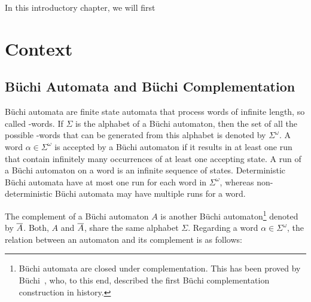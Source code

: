 In this introductory chapter, we will first 






\section{Context}
\label{1_context}

\subsection{Büchi Automata and Büchi Complementation}

Büchi automata are finite state automata that process words of infinite length, so called \om-words. If $\Sigma$ is the alphabet of a Büchi automaton, then the set of all the possible \om-words that can be generated from this alphabet is denoted by $\Sigma^\omega$. A word $\alpha \in \Sigma^\omega$ is accepted by a Büchi automaton if it results in at least one run that contain infinitely many occurrences of at least one accepting state. A run of a Büchi automaton on a word is an infinite sequence of states. Deterministic Büchi automata have at most one run for each word in $\Sigma^\omega$, whereas non-deterministic Büchi automata may have multiple runs for a word.

The complement of a Büchi automaton $A$ is another Büchi automaton\footnote{Büchi automata are closed under complementation. This has been proved by Büchi~\cite{buchi1960decision}, who, to this end, described the first Büchi complementation construction in history.} denoted by $\cl1{A}$. Both, $A$ and $\cl1{A}$, share the same alphabet $\Sigma$. Regarding a word $\alpha \in \Sigma^\omega$, the relation between an automaton and its complement is as follows:

